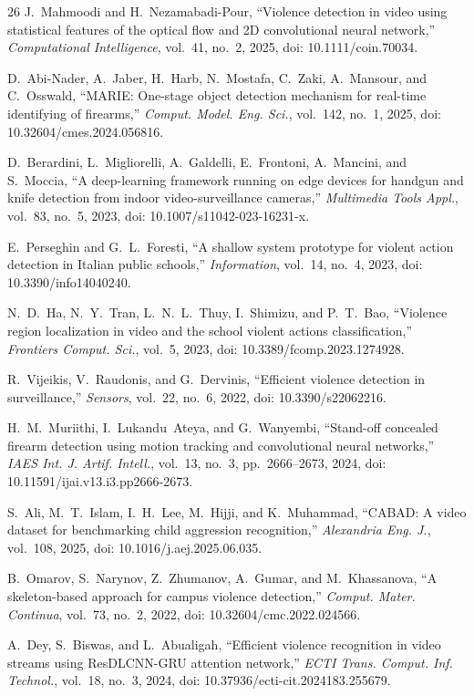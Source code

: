 \documentclass[conference]{IEEEtran}
\begin{document}
\begin{thebibliography}{26}
 J.~Mahmoodi and H.~Nezamabadi-Pour, ``Violence detection in video using statistical features of the optical flow and 2D convolutional neural network,'' \textit{Computational Intelligence}, vol.~41, no.~2, 2025, doi: 10.1111/coin.70034.

 D.~Abi-Nader, A.~Jaber, H.~Harb, N.~Mostafa, C.~Zaki, A.~Mansour, and C.~Osswald, ``MARIE: One-stage object detection mechanism for real-time identifying of firearms,'' \textit{Comput. Model. Eng. Sci.}, vol.~142, no.~1, 2025, doi: 10.32604/cmes.2024.056816.

 D.~Berardini, L.~Migliorelli, A.~Galdelli, E.~Frontoni, A.~Mancini, and S.~Moccia, ``A deep-learning framework running on edge devices for handgun and knife detection from indoor video-surveillance cameras,'' \textit{Multimedia Tools Appl.}, vol.~83, no.~5, 2023, doi: 10.1007/s11042-023-16231-x.

 E.~Perseghin and G.~L.~Foresti, ``A shallow system prototype for violent action detection in Italian public schools,'' \textit{Information}, vol.~14, no.~4, 2023, doi: 10.3390/info14040240.

 N.~D.~Ha, N.~Y.~Tran, L.~N.~L.~Thuy, I.~Shimizu, and P.~T.~Bao, ``Violence region localization in video and the school violent actions classification,'' \textit{Frontiers Comput. Sci.}, vol.~5, 2023, doi: 10.3389/fcomp.2023.1274928.

 R.~Vijeikis, V.~Raudonis, and G.~Dervinis, ``Efficient violence detection in surveillance,'' \textit{Sensors}, vol.~22, no.~6, 2022, doi: 10.3390/s22062216.

 H.~M.~Muriithi, I.~Lukandu~Ateya, and G.~Wanyembi, ``Stand-off concealed firearm detection using motion tracking and convolutional neural networks,'' \textit{IAES Int. J. Artif. Intell.}, vol.~13, no.~3, pp.~2666--2673, 2024, doi: 10.11591/ijai.v13.i3.pp2666-2673.

 S.~Ali, M.~T.~Islam, I.~H.~Lee, M.~Hijji, and K.~Muhammad, ``CABAD: A video dataset for benchmarking child aggression recognition,'' \textit{Alexandria Eng. J.}, vol.~108, 2025, doi: 10.1016/j.aej.2025.06.035.

 B.~Omarov, S.~Narynov, Z.~Zhumanov, A.~Gumar, and M.~Khassanova, ``A skeleton-based approach for campus violence detection,'' \textit{Comput. Mater. Continua}, vol.~73, no.~2, 2022, doi: 10.32604/cmc.2022.024566.

 A.~Dey, S.~Biswas, and L.~Abualigah, ``Efficient violence recognition in video streams using ResDLCNN-GRU attention network,'' \textit{ECTI Trans. Comput. Inf. Technol.}, vol.~18, no.~3, 2024, doi: 10.37936/ecti-cit.2024183.255679.


\end{thebibliography}
\end{document}
